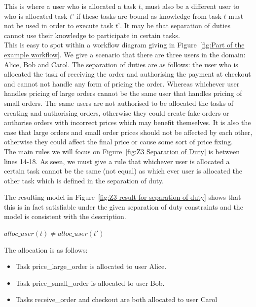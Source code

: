 \documentclass[a4paper]{report}
\begin{document}
This is where a user who is allocated a task $t$, must also be a different user to who is allocated task $t’$ if these tasks are bound as knowledge from task $t$ must not be used in order to execute task $t’$. It may be that separation of duties cannot use their knowledge to participate in certain tasks.\\

This is easy to spot within a workflow diagram giving in Figure~\ref{fig:Part of the example workflow}. We give a scenario that there are three users in the domain: Alice, Bob and Carol. The separation of duties are as follows: the user who is allocated the task of receiving the order and authorising the payment at checkout and cannot not handle any form of pricing the order. Whereas whichever user handles pricing of large orders cannot be the same user that handles pricing of small orders. The same users are not authorised to be allocated the tasks of creating and authorising orders, otherwise they could create fake orders or authorise orders with incorrect prices which may benefit themselves. It is also the case that large orders and small order prices should not be affected by each other, otherwise they could affect the final price or cause some sort of price fixing.\\

The main rules we will focus on Figure~\ref{fig:Z3 Separation of Duty} is between lines 14-18. As seen, we must give a rule that whichever user is allocated a certain task cannot be the same (not equal) as which ever user is allocated the other task which is defined in the separation of duty. 

The resulting model in Figure~\ref{fig:Z3 result for separation of duty} shows that this is in fact satisfiable under the given separation of duty constraints and the model is consistent with the description. 
\begin{center}
$alloc\_user(t) \neq alloc\_user(t\ensuremath{'})$
\end{center}
The allocation is as follows:
\begin{itemize}
\item Task price\_large\_order is allocated to user Alice.
\item Task price\_small\_order is allocated to user Bob.
\item Tasks receive\_order and checkout are both allocated to user Carol
\end{itemize}
\end{document}
